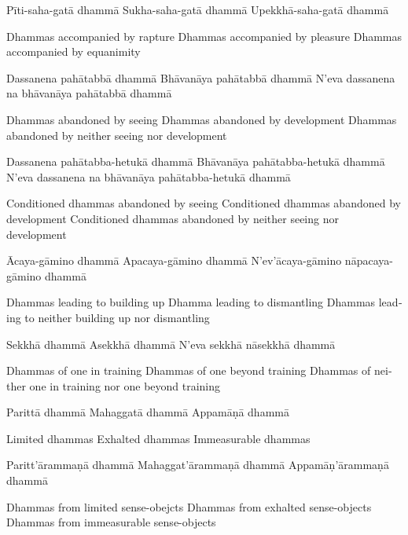 Pīti-saha-gatā dhammā
Sukha-saha-gatā dhammā
Upekkhā-saha-gatā dhammā

\begin{english}
  Dhammas accompanied by rapture
  Dhammas accompanied by pleasure
  Dhammas accompanied by equanimity
\end{english}

Dassanena pahātabbā dhammā
Bhāvanāya pahātabbā dhammā
N’eva dassanena na bhāvanāya pahātabbā dhammā

\begin{english}
  Dhammas abandoned by seeing
  Dhammas abandoned by development
  Dhammas abandoned by neither seeing nor development
\end{english}

Dassanena pahātabba-hetukā dhammā
Bhāvanāya pahātabba-hetukā dhammā
N’eva dassanena na bhāvanāya pahātabba-hetukā dhammā

\begin{english}
  Conditioned dhammas abandoned by seeing
  Conditioned dhammas abandoned by development
  Conditioned dhammas abandoned by neither seeing nor development
\end{english}

Ācaya-gāmino dhammā
Apacaya-gāmino dhammā
N’ev’ācaya-gāmino nāpacaya-gāmino dhammā

\begin{english}
  Dhammas leading to building up
  Dhamma leading to dismantling
  Dhammas leading to neither building up nor dismantling
\end{english}

Sekkhā dhammā
Asekkhā dhammā
N’eva sekkhā nāsekkhā dhammā

\begin{english}
  Dhammas of one in training
  Dhammas of one beyond training
  Dhammas of neither one in training nor one beyond training
\end{english}

Parittā dhammā
Mahaggatā dhammā
Appamāṇā dhammā

\begin{english}
  Limited dhammas
  Exhalted dhammas
  Immeasurable dhammas
\end{english}

Paritt’ārammaṇā dhammā
Mahaggat’ārammaṇā dhammā
Appamāṇ’ārammaṇā dhammā

\begin{english}
  Dhammas from limited sense-obejcts
  Dhammas from exhalted sense-objects
  Dhammas from immeasurable sense-objects
\end{english}

